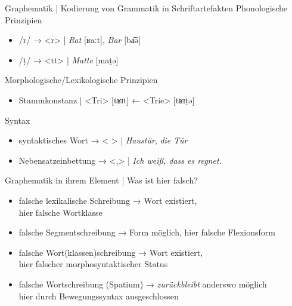 \begin{frame}
  {Graphematik | Kodierung von Grammatik in Schriftartefakten}
  \alert{Phonologische Prinzipien}\\
  \Halbzeile
  \begin{itemize}[<+->]
    \item /r/ → <r> | \textit{Rat} [ʁaːt], \textit{Bar} [ba͡ə]
    \item /ṭ/ → <tt> | \textit{Matte} [maṭə]
  \end{itemize}
  \Zeile
  \alert{Morphologische\slash Lexikologische Prinzipien}\\
  \Halbzeile
  \begin{itemize}[<+->]
    \item Stammkonstanz | <Tri> [tʁɪt] ← <Trie> [tʁɪṭə] 
  \end{itemize}
  \Zeile
  \alert{Syntax}
  \Halbzeile
  \begin{itemize}[<+->]
    \item syntaktisches Wort → < > | \textit{Haustür}, \textit{die Tür}
    \item Nebensatzeinbettung → <,> | \textit{Ich weiß, dass es regnet.}
  \end{itemize}
\end{frame}


\begin{frame}
  {Graphematik in ihrem Element | Was ist hier falsch?}
  \onslide<+->
  \onslide<+-> 
  \begin{exe}
    \ex\label{ex:graphematikalsteildergrammatik001}
    \begin{xlist}
      \onslide<+->
      \onslide<+->
      \onslide<+->
    \end{xlist}
  \end{exe}
  \begin{itemize}[<+->]
    \item falsche lexikalische Schreibung → Wort existiert,\\
      \alert{hier falsche Wortklasse}
    \item falsche Segmentschreibung → Form möglich, \alert{hier falsche Flexionsform}
    \item falsche Wort(klassen)schreibung → Wort existiert,\\
      \alert{hier falscher morphosyntaktischer Status}
    \item falsche Wortschreibung (Spatium) → \textit{zurückbleibt} anderswo möglich\\
      \alert{hier durch Bewegungssyntax ausgeschlossen}
  \end{itemize}
\end{frame}

